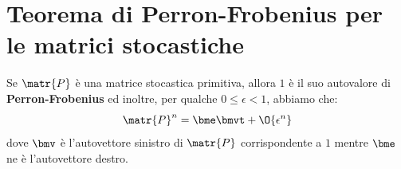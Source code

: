 \documentclass[\main/main.tex]{subfiles}
\begin{document}
\section{Teorema di Perron-Frobenius per le matrici stocastiche}
\begin{theorem}
  Se \(\matr{P}\) è una matrice stocastica primitiva, allora \(1\) è il suo autovalore di \textbf{Perron-Frobenius} ed inoltre, per qualche \(0 \leq \epsilon < 1\), abbiamo che:
  \[
    \matr{P}^n = \bme\bmvt + \O{\epsilon^n}
  \]
  dove \(\bmv \) è l'autovettore sinistro di \(\matr{P}\) corrispondente a \(1\) mentre \(\bme \) ne è l'autovettore destro.
\end{theorem}
\end{document}
